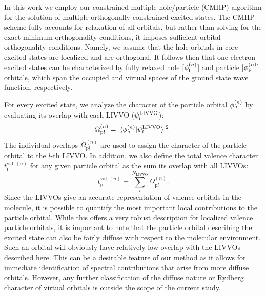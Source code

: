 \documentclass{article}
\begin{document}
In this work we employ our constrained multiple hole/particle (CMHP) algorithm\cite{ayers_time-independent_2012} for the solution of multiple orthogonally constrained excited states.
The CMHP scheme fully accounts for relaxation of all orbitals, but rather than solving for the exact minimum orthogonality conditions, it imposes  sufficient orbital orthogonality conditions. Namely, we assume that the hole orbitals in core-excited states are localized and are orthogonal.
It follows then that one-electron excited states can be characterized by fully relaxed hole [$\phi_{\rm h}^{(n)}$] and particle [$\phi_{\rm p}^{(n)}$] orbitals, which span the occupied and virtual spaces of the ground state wave function, respectively.

For every excited state, we analyze the character of the particle orbital $\phi_{\rm p}^{(n)}$ by evaluating its overlap with each LIVVO ($\psi^{\rm LIVVO}_l$):
\begin{equation}
\label{eq:part_livvo_overlap}
\Omega_{\mathrm{p}l}^{(n)} = | \langle \phi^{(n)}_\mathrm{p} | \psi^{\rm LIVVO}_l \rangle |^2.
\end{equation}
The individual overlaps $\Omega_{\mathrm{p}l}^{(n)}$ are used to assign the character of the particle orbital to the $l$-th LIVVO.
In addition, we also define the total valence character $t^{\mathrm{val},(n)}_\mathrm{p} $ for any given particle orbital as the sum its overlap with all LIVVOs:
\begin{equation}
t^{\mathrm{val},(n)}_\mathrm{p} = \sum_{l}^{N_\mathrm{LIVVO}} \Omega_{\mathrm{p}l}^{(n)}.
\label{eq:total_valence_character}
\end{equation}
Since the LIVVOs give an accurate representation of valence orbitals in the molecule, it is possible to quantify the most important local contributions to the particle orbital. While this offers a very robust description for localized valence particle orbitals, it is important to note that the particle orbital describing the excited state can also be fairly diffuse with respect to the molecular environment. Such an orbital will obviously have relatively low overlap with the LIVVOs described here. This can be a desirable feature of our method as it allows for immediate identification of spectral contributions that arise from more diffuse orbitals. 
However, any further classification of the diffuse nature or Rydberg character of virtual orbitals is outside the scope of the current study.
\end{document}
